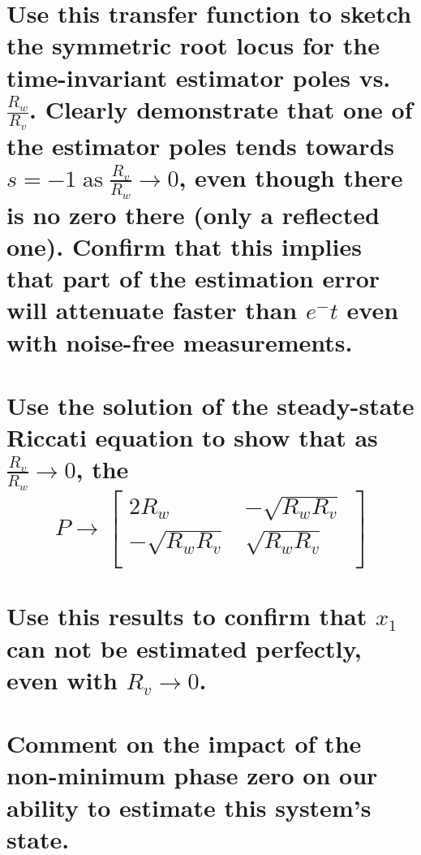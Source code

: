 \documentclass[12pt,letterpaper, onecolumn]{exam}
\begin{document}
\begin{questions}
\begin{parts}
        \part{Use this transfer function to sketch the symmetric root locus for the time-invariant estimator poles vs. $\frac{R_w}{R_v}$. Clearly demonstrate that one of the estimator poles tends towards $s  = -1\;\text{as}\;\frac{R_v}{R_w} \rightarrow 0$, even though there is no zero there (only a reflected one). Confirm that this implies that part of the estimation error will attenuate faster than $e^-t$ even with noise-free measurements.}

        \part{Use the solution of the steady-state Riccati equation to show that as $\frac{R_v}{R_w} \rightarrow 0$, the
            \begin{equation*}
                P \rightarrow
                \begin{bmatrix}
                    2R_w            & -\sqrt{R_w R_v} \\
                    -\sqrt{R_w R_v} & \sqrt{R_w R_v}  \\
                \end{bmatrix}
            \end{equation*}}

        \part{Use this results to confirm that $x_1$ can not be estimated perfectly, even with
            $R_v \rightarrow 0$.}

        \part{Comment on the impact of the non-minimum phase zero on our ability to estimate this system's state.}
    \end{parts}
\end{questions}
\end{document}
